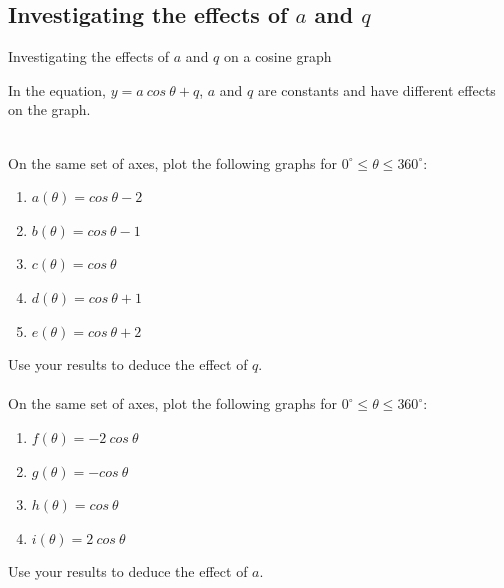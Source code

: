 \subsection*{Investigating the effects of $a$ and $q$}
\begin{Investigation}{Investigating the effects of $a$ and $q$ on a cosine graph}
{
In the equation, $y=a~cos~\theta+q$, $a$ and $q$ are constants and have different effects on the graph.\par 
\\
On the same set of axes, plot the following graphs for $0^{\circ} \leq \theta \leq 360^{\circ}$:
\begin{enumerate}[noitemsep, label=\textbf{\arabic*}. ] 
\item $a(\theta )=cos~\theta -2$
\item $b(\theta )=cos~\theta -1$
\item $c(\theta )=cos~\theta $
\item $d(\theta )=cos~\theta +1$
\item $e(\theta )=cos~\theta +2$
\end{enumerate}
Use your results to deduce the effect of $q$.\\
\\
On the same set of axes, plot the following graphs for $0^{\circ} \leq \theta \leq 360^{\circ}$:
\begin{enumerate}[noitemsep, label=\textbf{\arabic*}. ] 
\item $f(\theta )=-2~cos~\theta $
\item $g(\theta )=-cos~\theta $
\item $h(\theta )=cos~\theta $
\item $i(\theta )=2~cos~\theta $\end{enumerate}
Use your results to deduce the effect of $a$.\\
\\
}
\end{Investigation}
